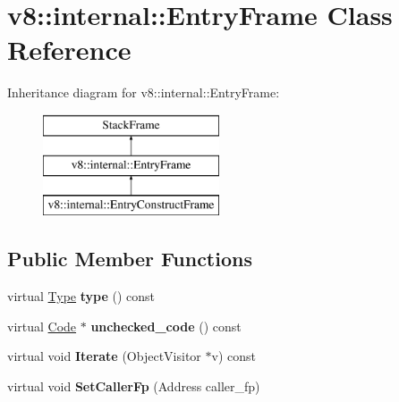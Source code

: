\hypertarget{classv8_1_1internal_1_1_entry_frame}{}\section{v8\+:\+:internal\+:\+:Entry\+Frame Class Reference}
\label{classv8_1_1internal_1_1_entry_frame}
Inheritance diagram for v8\+:\+:internal\+:\+:Entry\+Frame\+:\begin{figure}[H]
\begin{center}
\leavevmode
\includegraphics[height=3.000000cm]{classv8_1_1internal_1_1_entry_frame}
\end{center}
\end{figure}
\subsection*{Public Member Functions}
\begin{DoxyCompactItemize}
\item 
\hypertarget{classv8_1_1internal_1_1_entry_frame_aad6584c2acca7e4d6b2834abc7079aad}{}virtual \hyperlink{classv8_1_1internal_1_1_type_impl}{Type} {\bfseries type} () const \label{classv8_1_1internal_1_1_entry_frame_aad6584c2acca7e4d6b2834abc7079aad}

\item 
\hypertarget{classv8_1_1internal_1_1_entry_frame_a44be3194a22eeaf2c1eadfa5a78f30dc}{}virtual \hyperlink{classv8_1_1internal_1_1_code}{Code} $\ast$ {\bfseries unchecked\+\_\+code} () const \label{classv8_1_1internal_1_1_entry_frame_a44be3194a22eeaf2c1eadfa5a78f30dc}

\item 
\hypertarget{classv8_1_1internal_1_1_entry_frame_abd0693ce8e7b0527ea490fc7972e2390}{}virtual void {\bfseries Iterate} (Object\+Visitor $\ast$v) const \label{classv8_1_1internal_1_1_entry_frame_abd0693ce8e7b0527ea490fc7972e2390}

\item 
\hypertarget{classv8_1_1internal_1_1_entry_frame_a1e515873222fed37be9611abc91ea0ab}{}virtual void {\bfseries Set\+Caller\+Fp} (Address caller\+\_\+fp)\label{classv8_1_1internal_1_1_entry_frame_a1e515873222fed37be9611abc91ea0ab}

\end{DoxyCompactItemize}
